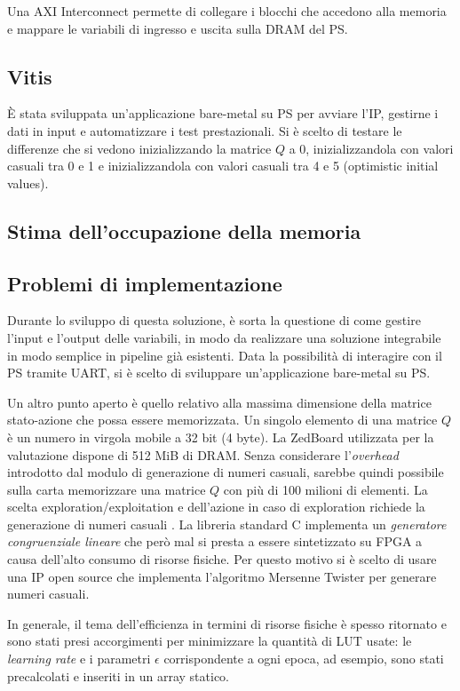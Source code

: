 \documentclass{article}
\begin{document}
Una AXI Interconnect permette di collegare i blocchi che accedono alla memoria e mappare le variabili di ingresso e uscita sulla DRAM del PS. 

\subsection{Vitis}
È stata sviluppata un'applicazione bare-metal su PS per avviare l'IP, gestirne i dati in input e automatizzare i test prestazionali. 
Si è scelto di testare le differenze che si vedono inizializzando la matrice $Q$ a 0, inizializzandola con valori casuali tra 0 e 1  e inizializzandola con valori casuali tra 4 e 5 (optimistic initial values). 

\subsection{Stima dell'occupazione della memoria}
\subsection{Problemi di implementazione}
Durante lo sviluppo di questa soluzione, è sorta la questione di come gestire l'input e l'output delle variabili, in modo da realizzare una soluzione integrabile in modo semplice in pipeline già esistenti. 
Data la possibilità di interagire con il PS tramite UART, si è scelto di sviluppare un'applicazione bare-metal su PS. 

Un altro punto aperto è quello relativo alla massima dimensione della matrice stato-azione che possa essere memorizzata. 
Un singolo elemento di una matrice $Q$ è un numero in virgola mobile a 32 bit (4 byte).
La ZedBoard utilizzata per la valutazione dispone di 512 MiB di DRAM.
Senza considerare l'\emph{overhead} introdotto dal modulo di generazione di numeri casuali, sarebbe quindi possibile sulla carta memorizzare una matrice $Q$ con più di 100 milioni di elementi. 
La scelta exploration/exploitation e dell'azione in caso di exploration richiede la generazione di numeri casuali \citep{sutton_reinforcement_2018}.
La libreria standard C implementa un \emph{generatore congruenziale lineare} che però mal si presta a essere sintetizzato su FPGA a causa dell'alto consumo di risorse fisiche. 
Per questo motivo si è scelto di usare una IP open source \citep{fedorko_wfedorkomersenne-twister-hls_2018} che implementa l'algoritmo Mersenne Twister per generare numeri casuali.

In generale, il tema dell'efficienza in termini di risorse fisiche è spesso ritornato e sono stati presi accorgimenti per minimizzare la quantità di LUT usate: le \emph{learning rate} e i parametri $\epsilon$ corrispondente a ogni epoca, ad esempio, sono stati precalcolati e inseriti in un array statico. 
\end{document}
